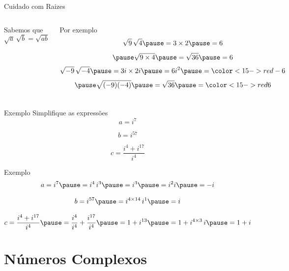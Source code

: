 \begin{frame}{Cuidado com Raizes}
\begin{columns}
  Sabemos que
  \[
    \sqrt{a}\,\sqrt{b} = \sqrt{ab}
  \]

  \pause
  Por exemplo
  \[
    \sqrt{9}\,\sqrt{4}
    \pause
    = 3\times 2
    \pause
    = 6
  \]
  \[
    \pause
    \sqrt{9\times 4}
    \pause
    = \sqrt{36}
    \pause
    = 6
  \]
  \pause
  \[
    \sqrt{-9}\,\sqrt{-4}
    \pause
    = 3i\times 2i
    \pause
    = 6i^2
    \pause
    = {\color<15->{red}-6}
  \]
  \[
    \pause
    \sqrt{(-9)(-4)}
    \pause
    = \sqrt{36}
    \pause
    = {\color<15->{red}6}
  \]

  \vspace{\baselineskip}
\end{columns}
\end{frame}

\addtocounter{exemplo}{1}
\begin{frame}{Exemplo \theexemplo}
  Simplifique as expressões
  \[
    a = i^7
  \]

  \[
    b = i^{57}
  \]

  \[
    c = \frac{i^4 + i^{17}}{i^4}
  \]
\end{frame}

\begin{frame}{Exemplo \theexemplo}
  \[
    a
    = i^7
    \pause
    = i^4 \, i^3
    \pause
    = i^3
    \pause
    = i^2 i
    \pause
    = -i
  \]

  \pause
  \vspace{\baselineskip}
  \[
    b
    = i^{57}
    \pause
    = i^{4\times 14} \, i^1
    \pause
    = i
  \]

  \pause
  \vspace{\baselineskip}
  \[
    c
    = \frac{i^4 + i^{17}}{i^4}
    \pause
    = \frac{i^4}{i^4} + \frac{i^{17}}{i^4}
    \pause
    = 1 + i^{13}
    \pause
    = 1 + i^{4\times 3} \, i
    \pause
    = 1 + i
  \]
\end{frame}

\section{Números Complexos}

